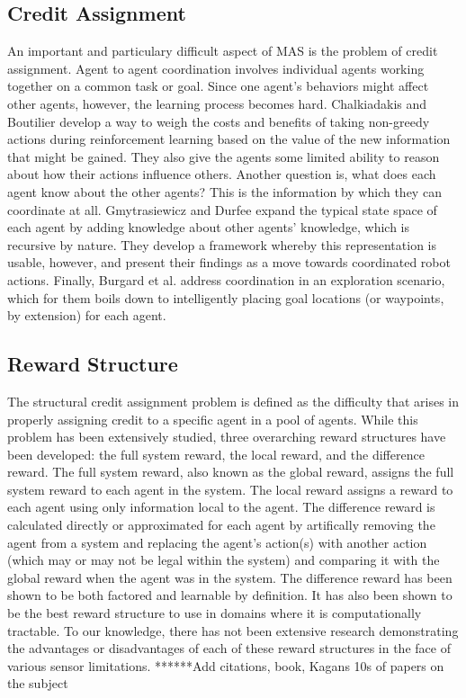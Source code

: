 \documentclass[letterpaper, 10 pt, conference]{ieeeconf}  %
\begin{document}
\subsection{Credit Assignment}
An important and particulary difficult aspect of MAS is the problem of
credit assignment. Agent to agent coordination involves individual
agents working together on a common task or goal. Since one agent’s
behaviors might affect other agents, however, the learning process
becomes hard. Chalkiadakis and Boutilier \cite{chalkiadakis2003coordination} develop a way to weigh
the costs and benefits of taking non-greedy actions during
reinforcement learning based on the value of the new information that
might be gained. They also give the agents some limited ability to
reason about how their actions influence others. Another question is,
what does each agent know about the other agents? This is the
information by which they can coordinate at all. Gmytrasiewicz and
Durfee \cite{gmytrasiewicz2000rational} expand the typical state space of each agent by adding
knowledge about other agents’ knowledge, which is recursive by
nature. They develop a framework whereby this representation is
usable, however, and present their findings as a move towards
coordinated robot actions. Finally, Burgard et al. \cite{burgard2005coordinated} address
coordination in an exploration scenario, which for them boils down to
intelligently placing goal locations (or waypoints, by extension) for
each agent.

\subsection{Reward Structure}
The structural credit assignment problem is defined as the difficulty that arises in properly assigning credit 
to a specific agent in a pool of agents.  While this problem has been extensively studied, three overarching reward 
structures have been developed: the full system reward, the local reward, and the difference reward.  The full system reward, 
also known as the global reward, assigns the full system reward to each agent in the system.  The local reward assigns a reward
to each agent using only information local to the agent. The difference reward is calculated directly or approximated for each agent by artifically removing the agent from a system and replacing the agent's action(s) with another action (which may or may not be legal within the system) and comparing it with the global reward when the agent was in the system. The difference reward has been shown to be both factored and learnable by definition. It has also been shown to be the best reward structure to use in
domains where it is computationally tractable. To our knowledge, there has not been extensive 
research demonstrating the advantages or disadvantages of each of these reward structures in 
the face of various sensor limitations. ******Add citations, book, Kagans 10s of papers on the subject
\end{document}
